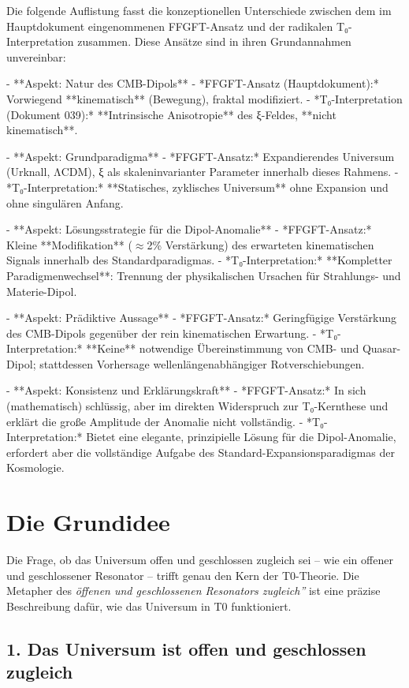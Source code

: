 	Die folgende Auflistung fasst die konzeptionellen Unterschiede zwischen dem im Hauptdokument eingenommenen FFGFT-Ansatz und der radikalen T₀-Interpretation zusammen. Diese Ansätze sind in ihren Grundannahmen unvereinbar:
	
	- **Aspekt: Natur des CMB-Dipols**
	- *FFGFT-Ansatz (Hauptdokument):* Vorwiegend **kinematisch** (Bewegung), fraktal modifiziert.
	- *T₀-Interpretation (Dokument 039):* **Intrinsische Anisotropie** des ξ-Feldes, **nicht kinematisch**.
	
	- **Aspekt: Grundparadigma**
	- *FFGFT-Ansatz:* Expandierendes Universum (Urknall, ΛCDM), ξ als skaleninvarianter Parameter innerhalb dieses Rahmens.
	- *T₀-Interpretation:* **Statisches, zyklisches Universum** ohne Expansion und ohne singulären Anfang.
	
	- **Aspekt: Lösungsstrategie für die Dipol-Anomalie**
	- *FFGFT-Ansatz:* Kleine **Modifikation** ($\approx$2\% Verstärkung) des erwarteten kinematischen Signals innerhalb des Standardparadigmas.
	- *T₀-Interpretation:* **Kompletter Paradigmenwechsel**: Trennung der physikalischen Ursachen für Strahlungs- und Materie-Dipol.
	
	- **Aspekt: Prädiktive Aussage**
	- *FFGFT-Ansatz:* Geringfügige Verstärkung des CMB-Dipols gegenüber der rein kinematischen Erwartung.
	- *T₀-Interpretation:* **Keine** notwendige Übereinstimmung von CMB- und Quasar-Dipol; stattdessen Vorhersage wellenlängenabhängiger Rotverschiebungen.
	
	- **Aspekt: Konsistenz und Erklärungskraft**
	- *FFGFT-Ansatz:* In sich (mathematisch) schlüssig, aber im direkten Widerspruch zur T₀-Kernthese und erklärt die große Amplitude der Anomalie nicht vollständig.
	- *T₀-Interpretation:* Bietet eine elegante, prinzipielle Lösung für die Dipol-Anomalie, erfordert aber die vollständige Aufgabe des Standard-Expansionsparadigmas der Kosmologie.
	
	\section*{Die Grundidee}
	
	Die Frage, ob das Universum offen und geschlossen zugleich sei – wie ein offener und geschlossener Resonator – trifft genau den Kern der T0-Theorie. Die Metapher des \textit{öffenen und geschlossenen Resonators zugleich''} ist eine präzise Beschreibung dafür, wie das Universum in T0 funktioniert.
	
	\subsection*{1. Das Universum ist offen und geschlossen zugleich}
	
